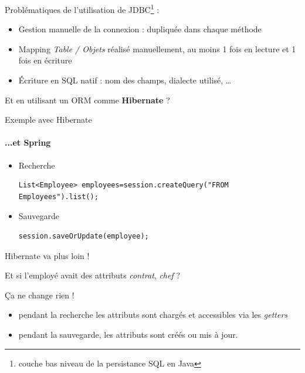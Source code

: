 \documentclass[compact]{beamer}%
\begin{document}
\begin{frame}
	Problématiques de l'utilisation de JDBC\footnote{couche bas niveau de la persistance SQL en Java} :
	\begin{itemize}
	\item Gestion manuelle de la connexion : dupliquée dans chaque méthode
	\item Mapping \emph{Table / Objets} réalisé manuellement, au moins 1 fois en lecture et 1 fois en écriture
	\item Écriture en SQL natif : nom des champs, dialecte utilisé, \dots
	\end{itemize}
	
	\pause
	\begin{block}{}
	\center
	Et en utilisant un ORM comme \textbf{Hibernate} ?
	\end{block}
		
\end{frame}
		
\begin{frame}[fragile]{Exemple avec Hibernate}
	\framesubtitle{...et Spring}
	
	\begin{itemize}[<+->]
	\item Recherche
	\begin{lstlisting}
List<Employee> employees=session.createQuery("FROM Employees").list();
\end{lstlisting}
	\item Sauvegarde
	\begin{lstlisting}
session.saveOrUpdate(employee);
	\end{lstlisting}	
	\end{itemize}	
\end{frame}

\begin{frame}{Hibernate va plus loin !}
	
	\begin{block}{}
	\center
	Et si l'employé avait des attributs \emph{contrat}, \emph{chef} ?
	\end{block}
	
	\pause
	Ça ne change rien !
	\begin{itemize}
	\item pendant la recherche les attributs sont chargés et accessibles via les \emph{getters}
	\item pendant la sauvegarde, les attributs sont créés ou mis à jour.
	\end{itemize}
	
\end{frame}
	
\end{document}
